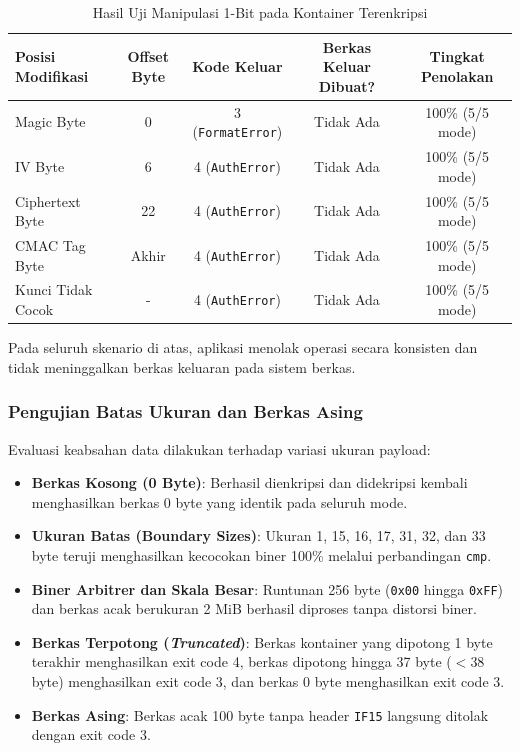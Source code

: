 \begin{table}[ht]
\centering
\caption{Hasil Uji Manipulasi 1-Bit pada Kontainer Terenkripsi}
\label{tab:tamper_results}
\begin{tabular}{|l|c|c|c|c|}
\hline
\textbf{Posisi Modifikasi} & \textbf{Offset Byte} & \textbf{Kode Keluar} & \textbf{Berkas Keluar Dibuat?} & \textbf{Tingkat Penolakan} \\
\hline
Magic Byte & 0 & 3 (\texttt{FormatError}) & Tidak Ada & 100\% (5/5 mode) \\
IV Byte & 6 & 4 (\texttt{AuthError}) & Tidak Ada & 100\% (5/5 mode) \\
Ciphertext Byte & 22 & 4 (\texttt{AuthError}) & Tidak Ada & 100\% (5/5 mode) \\
CMAC Tag Byte & Akhir & 4 (\texttt{AuthError}) & Tidak Ada & 100\% (5/5 mode) \\
Kunci Tidak Cocok & - & 4 (\texttt{AuthError}) & Tidak Ada & 100\% (5/5 mode) \\
\hline
\end{tabular}
\end{table}
Pada seluruh skenario di atas, aplikasi menolak operasi secara konsisten dan tidak meninggalkan berkas keluaran pada sistem berkas.

\subsubsection{Pengujian Batas Ukuran dan Berkas Asing}
Evaluasi keabsahan data dilakukan terhadap variasi ukuran payload:
\begin{itemize}
    \item \textbf{Berkas Kosong (0 Byte)}: Berhasil dienkripsi dan didekripsi kembali menghasilkan berkas 0 byte yang identik pada seluruh mode.
    \item \textbf{Ukuran Batas (Boundary Sizes)}: Ukuran 1, 15, 16, 17, 31, 32, dan 33 byte teruji menghasilkan kecocokan biner 100\% melalui perbandingan \texttt{cmp}.
    \item \textbf{Biner Arbitrer dan Skala Besar}: Runtunan 256 byte (\texttt{0x00} hingga \texttt{0xFF}) dan berkas acak berukuran 2 MiB berhasil diproses tanpa distorsi biner.
    \item \textbf{Berkas Terpotong (\textit{Truncated})}: Berkas kontainer yang dipotong 1 byte terakhir menghasilkan exit code 4, berkas dipotong hingga 37 byte ($< 38$ byte) menghasilkan exit code 3, dan berkas 0 byte menghasilkan exit code 3.
    \item \textbf{Berkas Asing}: Berkas acak 100 byte tanpa header \texttt{IF15} langsung ditolak dengan exit code 3.
\end{itemize}


